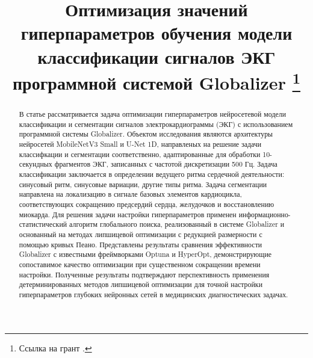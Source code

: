 \documentclass[11pt, oneside, a4paper]{article}
\begin{document}

\title{Оптимизация значений гиперпараметров обучения модели классификации сигналов ЭКГ программной системой Globalizer \footnote{Ссылка на грант .}}


\begin{abstract}
В статье рассматривается задача оптимизации гиперпараметров нейросетевой модели классификации и сегментации сигналов электрокардиограммы (ЭКГ) с использованием программной системы Globalizer. Объектом исследования являются архитектуры нейросетей MobileNetV3 Small и U-Net 1D, направленых на решение задачи классифкации и сегментации соответственно, адаптированные для обработки 10-секундных фрагментов ЭКГ, записанных с частотой дискретизации 500 Гц. 
Задача классификации заключается в определении ведущего ритма сердечной деятельности: синусовый ритм, синусовые вариации, другие типы ритма. Задача сегментации направлена на локализацию в сигнале базовых элементов кардиоцикла, соответствующих сокращению предсердий сердца, желудочков и восстановлению миокарда. 
Для решения задачи настройки гиперпараметров применен информационно-статистический алгоритм глобального поиска, реализованный в системе Globalizer и основанный на методах липшицевой оптимизации с редукцией размерности с помощью кривых Пеано. 
Представлены результаты сравнения эффективности Globalizer с известными фреймворками Optuna и HyperOpt, демонстрирующие сопоставимое качество оптимизации при существенном сокращении времени настройки. Полученные результаты подтверждают перспективность применения детерминированных методов липшицевой оптимизации для точной настройки гиперпараметров глубоких нейронных сетей в медицинских диагностических задачах.
\end{abstract}

\end{document}
